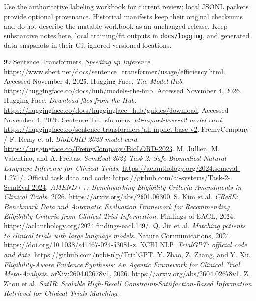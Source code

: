 \documentclass[10pt,letterpaper]{article}
\newcommand{\pathcode}[1]{\nolinkurl{#1}}
\begin{document}
Use the authoritative labeling workbook for current review; local JSONL
packets provide optional provenance. Historical manifests keep their original
checksums and do not describe the mutable workbook as an unchanged release.
Keep substantive notes here, local training/fit outputs in \pathcode{docs/logging},
and generated data snapshots in their Git-ignored versioned locations.

\clearpage
\begin{thebibliography}{99}
 Sentence Transformers. \emph{Speeding up Inference}.
\url{https://www.sbert.net/docs/sentence_transformer/usage/efficiency.html}.
Accessed November 4, 2026.
 Hugging Face. \emph{The Model Hub}.
\url{https://huggingface.co/docs/hub/models-the-hub}. Accessed November 4, 2026.
 Hugging Face. \emph{Download files from the Hub}.
\url{https://huggingface.co/docs/huggingface_hub/guides/download}. Accessed November 4, 2026.
 Sentence Transformers. \emph{all-mpnet-base-v2 model card}.
\url{https://huggingface.co/sentence-transformers/all-mpnet-base-v2}.
 FremyCompany / F. Remy et al. \emph{BioLORD-2023 model card}.
\url{https://huggingface.co/FremyCompany/BioLORD-2023}.
 M. Jullien, M. Valentino, and A. Freitas.
\emph{SemEval-2024 Task 2: Safe Biomedical Natural Language Inference for Clinical Trials}.
\url{https://aclanthology.org/2024.semeval-1.271/}.
Official task data and code: \url{https://github.com/ai-systems/Task-2-SemEval-2024}.
 \emph{AMEND++: Benchmarking Eligibility Criteria Amendments in Clinical Trials}.
2026. \url{https://arxiv.org/abs/2601.06300}.
 S. Kim et al. \emph{CReSE: Benchmark Data and Automatic Evaluation Framework for Recommending Eligibility Criteria from Clinical Trial Information}.
Findings of EACL, 2024. \url{https://aclanthology.org/2024.findings-eacl.149/}.
 Q. Jin et al. \emph{Matching patients to clinical trials with large language models}.
Nature Communications, 2024. \url{https://doi.org/10.1038/s41467-024-53081-z}.
 NCBI NLP. \emph{TrialGPT: official code and data}.
\url{https://github.com/ncbi-nlp/TrialGPT}.
 Y. Zhao, Z. Zhang, and Y. Xu.
\emph{Eligibility-Aware Evidence Synthesis: An Agentic Framework for Clinical Trial Meta-Analysis}.
arXiv:2604.02678v1, 2026. \url{https://arxiv.org/abs/2604.02678v1}.
 Z. Zhou et al. \emph{SatIR: Scalable High-Recall Constraint-Satisfaction-Based Information Retrieval for Clinical Trials Matching}.

\end{thebibliography}
\end{document}

